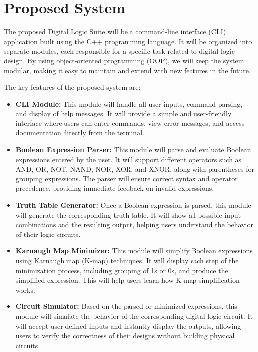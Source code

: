 \section{Proposed System}

The proposed Digital Logic Suite will be a command-line interface (CLI) application built using the C++ programming language. It will be organized into separate modules, each responsible for a specific task related to digital logic design. By using object-oriented programming (OOP), we will keep the system modular, making it easy to maintain and extend with new features in the future.

The key features of the proposed system are:

\begin{itemize}
    \item \textbf{CLI Module:} This module will handle all user inputs, command parsing, and display of help messages. It will provide a simple and user-friendly interface where users can enter commands, view error messages, and access documentation directly from the terminal.

    \item \textbf{Boolean Expression Parser:} This module will parse and evaluate Boolean expressions entered by the user. It will support different operators such as AND, OR, NOT, NAND, NOR, XOR, and XNOR, along with parentheses for grouping expressions. The parser will ensure correct syntax and operator precedence, providing immediate feedback on invalid expressions.

    \item \textbf{Truth Table Generator:} Once a Boolean expression is parsed, this module will generate the corresponding truth table. It will show all possible input combinations and the resulting output, helping users understand the behavior of their logic circuits.

    \item \textbf{Karnaugh Map Minimizer:} This module will simplify Boolean expressions using Karnaugh map (K-map) techniques. It will display each step of the minimization process, including grouping of 1s or 0s, and produce the simplified expression. This will help users learn how K-map simplification works.

    \item \textbf{Circuit Simulator:} Based on the parsed or minimized expressions, this module will simulate the behavior of the corresponding digital logic circuit. It will accept user-defined inputs and instantly display the outputs, allowing users to verify the correctness of their designs without building physical circuits.


\end{itemize}
